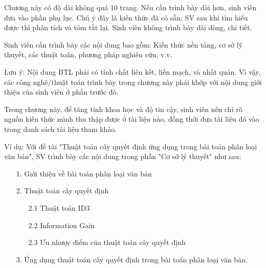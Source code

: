 \documentclass[../BTL.tex]{subfiles}
\begin{document}
Chương này có độ dài không quá 10 trang. Nếu cần trình bày dài hơn, sinh viên đưa vào phần phụ lục. Chú ý đây là kiến thức đã có sẵn; SV sau khi tìm hiểu được thì phân tích và tóm tắt lại. Sinh viên không trình bày dài dòng, chi tiết. 

Sinh viên cần trình bày các nội dung bao gồm: Kiến thức nền tảng, cơ sở lý thuyết, các thuật toán, phương pháp nghiên cứu, v.v.

Lưu ý: Nội dung BTL phải có tính chất liên kết, liền mạch, và nhất quán. Vì vậy, các công nghệ/thuật toán trình bày trong chương này phải khớp với nội dung giới thiệu của sinh viên ở phần trước đó. 

Trong chương này, để tăng tính khoa học và độ tin cậy, sinh viên nên chỉ rõ nguồn kiến thức mình thu thập được ở tài liệu nào, đồng thời đưa tài liệu đó vào trong danh sách tài liệu tham khảo.

Ví dụ: Với đề tài "Thuật toán cây quyết định ứng dụng trong bài toán phân loại văn bản", SV trình bày các nội dung trong phần "Cơ sở lý thuyết" như sau:
\begin{itemize}
    \item[1.] Giới thiệu về bài toán phân loại văn bản
    \item[2.] Thuật toán cây quyết định
    \begin{itemize}
        \item[2.1] Thuật toán ID3
        \item[2.2] Information Gain
        \item[2.3] Ưu nhược điểm của thuật toán cây quyết định
    \end{itemize}
    \item[3.] Ứng dụng thuật toán cây quyết định trong bài toán phân loại văn bản.
\end{itemize}
\end{document}
